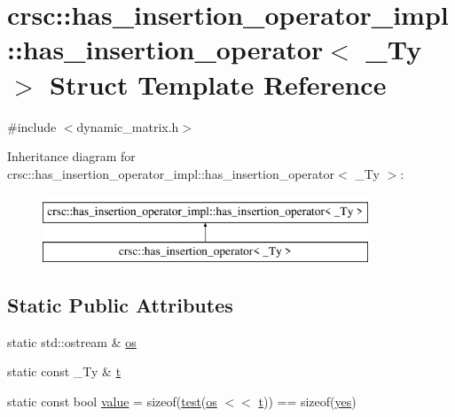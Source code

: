 \hypertarget{structcrsc_1_1has__insertion__operator__impl_1_1has__insertion__operator}{}\section{crsc\+:\+:has\+\_\+insertion\+\_\+operator\+\_\+impl\+:\+:has\+\_\+insertion\+\_\+operator$<$ \+\_\+\+Ty $>$ Struct Template Reference}
\label{structcrsc_1_1has__insertion__operator__impl_1_1has__insertion__operator}


{\ttfamily \#include $<$dynamic\+\_\+matrix.\+h$>$}

Inheritance diagram for crsc\+:\+:has\+\_\+insertion\+\_\+operator\+\_\+impl\+:\+:has\+\_\+insertion\+\_\+operator$<$ \+\_\+\+Ty $>$\+:\begin{figure}[H]
\begin{center}
\leavevmode
\includegraphics[height=2.000000cm]{structcrsc_1_1has__insertion__operator__impl_1_1has__insertion__operator}
\end{center}
\end{figure}
\subsection*{Static Public Attributes}
\begin{DoxyCompactItemize}
\item 
static std\+::ostream \& \hyperlink{structcrsc_1_1has__insertion__operator__impl_1_1has__insertion__operator_a99b73f462e0865446ba1ee620f4ddf5f}{os}
\item 
static const \+\_\+\+Ty \& \hyperlink{structcrsc_1_1has__insertion__operator__impl_1_1has__insertion__operator_ae450042bbfde15944de60bdb394a5df0}{t}
\item 
static const bool \hyperlink{structcrsc_1_1has__insertion__operator__impl_1_1has__insertion__operator_ab2d5f0eebe065054f52d71d070aede53}{value} = sizeof(\hyperlink{namespacecrsc_1_1has__insertion__operator__impl_aa24ee37999d6977adf54ba500c212841}{test}(\hyperlink{structcrsc_1_1has__insertion__operator__impl_1_1has__insertion__operator_a99b73f462e0865446ba1ee620f4ddf5f}{os} $<$$<$ \hyperlink{structcrsc_1_1has__insertion__operator__impl_1_1has__insertion__operator_ae450042bbfde15944de60bdb394a5df0}{t})) == sizeof(\hyperlink{namespacecrsc_1_1has__insertion__operator__impl_ab0dc7f56fe45b46b87bb577b7171858c}{yes})
\end{DoxyCompactItemize}


